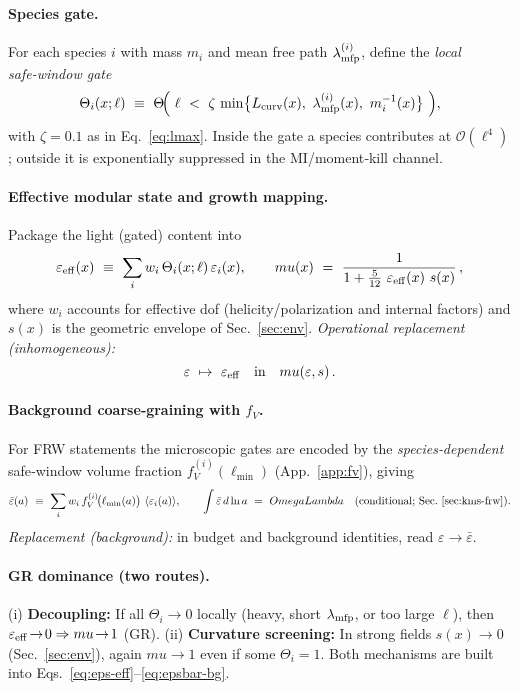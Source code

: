 \documentclass[aps,prd,onecolumn,superscriptaddress,nofootinbib]{revtex4-2}
\def\OmL{OmegaLambda}%
\def\mu{mu}%
\def\Omega_\Lambda{OmegaLambda}%
\providecommand{\OmL}{\Omega_\Lambda}
\providecommand{\be}{\begin{equation}}
\providecommand{\ee}{\end{equation}}
\begin{document}
\paragraph{Species gate.}
For each species \(i\) with mass \(m_i\) and mean free path \(\lambda_{\rm mfp}^{(i)}\), define the \emph{local safe‑window gate}
\be
\label{eq:theta-gate}
\Theta_i(x;\ell)\ \equiv\ \Theta\!\Big(\ \ell\ <\ \zeta\,\min\!\big\{L_{\rm curv}(x),\ \lambda_{\rm mfp}^{(i)}(x),\ m_i^{-1}(x)\big\}\ \Big),
\ee
with \(\zeta=0.1\) as in Eq.~\eqref{eq:lmax}. Inside the gate a species contributes at \(\mathcal O(\ell^4)\); outside it is exponentially suppressed in the MI/moment‑kill channel.

\paragraph{Effective modular state and growth mapping.}
Package the light (gated) content into
\be
\label{eq:eps-eff}
\varepsilon_{\rm eff}(x)\ \equiv\ \sum_{i} w_i\,\Theta_i(x;\ell)\,\varepsilon_i(x),
\qquad
\mu(x)\ =\ \frac{1}{1+\tfrac{5}{12}\ \varepsilon_{\rm eff}(x)\ s(x)}\,,
\ee
where \(w_i\) accounts for effective dof (helicity/polarization and internal factors) and \(s(x)\) is the geometric envelope of Sec.~\ref{sec:env}. \emph{Operational replacement (inhomogeneous):}
\[
\varepsilon\ \mapsto\ \varepsilon_{\rm eff}
\quad\text{in}\quad \mu(\varepsilon,s)\,.
\]

\paragraph{Background coarse‑graining with \(f_V\).}
For FRW statements the microscopic gates are encoded by the \emph{species‑dependent} safe‑window volume fraction \(f_V^{(i)}(\ell_{\min})\) (App.~\ref{app:fv}), giving
\be
\label{eq:epsbar-bg}
\bar\varepsilon(a)\ \equiv\ \sum_i w_i\, f_V^{(i)}\!\big(\ell_{\min}(a)\big)\ \langle \varepsilon_i(a)\rangle,
\qquad
\int \bar\varepsilon\, d\ln a\ =\ \OmL \quad\text{(conditional; Sec.~\ref{sec:kms-frw})}.
\ee
\emph{Replacement (background):} in budget and background identities, read \(\varepsilon\to\bar\varepsilon\).

\paragraph{GR dominance (two routes).}
(i) \textbf{Decoupling:} If all \(\Theta_i\!\to\!0\) locally (heavy, short \(\lambda_{\rm mfp}\), or too large \(\ell\)), then \(\varepsilon_{\rm eff}\!\to\!0\Rightarrow \mu\!\to\!1\) (GR). (ii) \textbf{Curvature screening:} In strong fields \(s(x)\!\to\!0\) (Sec.~\ref{sec:env}), again \(\mu\!\to\!1\) even if some \(\Theta_i=1\). Both mechanisms are built into Eqs.~\eqref{eq:eps-eff}–\eqref{eq:epsbar-bg}.
\end{document}
